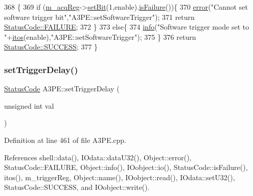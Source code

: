 \begin{DoxyCode}
368                                               \{
369   \textcolor{keywordflow}{if} (\hyperlink{classA3PE_abaf426f4c9192537117b77f9f4821e04}{m\_acqReg}->\hyperlink{classRegister_ab094246dd12aa7e0aa0ca917f4e70b31}{setBit}(1,enable).\hyperlink{classStatusCode_a5dd22dc6eb2c52fc4cabc58f6dea2eb7}{isFailure}())\{
370     \hyperlink{classObject_a204a95f57818c0f811933917a30eff45}{error}(\textcolor{stringliteral}{"Cannot set software trigger bit"},\textcolor{stringliteral}{"A3PE::setSoftwareTrigger"});
371     \textcolor{keywordflow}{return} \hyperlink{classStatusCode_a6f565cbeadc76d14c72f047e5e85eb4ba3da73d4c469762eb9d3c960368252b26}{StatusCode::FAILURE};
372   \}
373   \textcolor{keywordflow}{else}\{
374     \hyperlink{classObject_a644fd329ea4cb85f54fa6846484b84a8}{info}(\textcolor{stringliteral}{"Software trigger mode set to "}+\hyperlink{Tools_8h_af330027dbdafb9a30768b3613c553e60}{itos}(enable),\textcolor{stringliteral}{"A3PE::setSoftwareTrigger"});
375   \}
376   \textcolor{keywordflow}{return} \hyperlink{classStatusCode_a6f565cbeadc76d14c72f047e5e85eb4badd0da38d3ba0d922efd1f4619bc37ad8}{StatusCode::SUCCESS};
377 \}
\end{DoxyCode}
\mbox{\label{classA3PE_a6a63fc9503e0aa89ee9928fc7222ce0f}} 
\subsubsection{\texorpdfstring{set\+Trigger\+Delay()}{setTriggerDelay()}}
{\footnotesize\ttfamily \hyperlink{classStatusCode}{Status\+Code} A3\+P\+E\+::set\+Trigger\+Delay (\begin{DoxyParamCaption}\item[{unsigned int}]{val }\end{DoxyParamCaption})}



Definition at line 461 of file A3\+P\+E.\+cpp.



References shell\+::data(), I\+Odata\+::data\+U32(), Object\+::error(), Status\+Code\+::\+F\+A\+I\+L\+U\+RE, Object\+::info(), I\+Oobject\+::io(), Status\+Code\+::is\+Failure(), itos(), m\+\_\+trigger\+Reg, Object\+::name(), I\+Oobject\+::read(), I\+Odata\+::set\+U32(), Status\+Code\+::\+S\+U\+C\+C\+E\+SS, and I\+Oobject\+::write().



